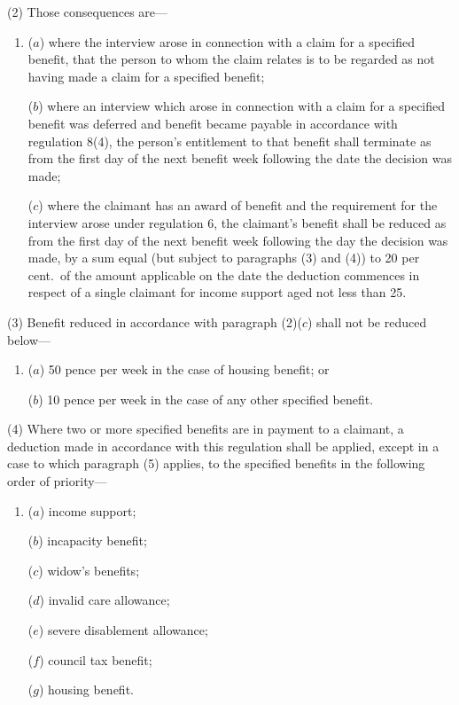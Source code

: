 \documentclass[12pt,a4paper]{article}
\begin{document}
(2) Those consequences are—
\begin{enumerate}\item[]
($a$) where the interview arose in connection with a claim for a specified benefit, that the person to whom the claim relates is to be regarded as not having made a claim for a specified benefit;

($b$) where an interview which arose in connection with a claim for a specified benefit was deferred and benefit became payable in accordance with regulation 8(4), the person’s entitlement to that benefit shall terminate as from the first day of the next benefit week following the date the decision was made;

($c$) where the claimant has an award of benefit and the requirement for the interview arose under regulation 6, the claimant’s benefit shall be reduced as from the first day of the next benefit week following the day the decision was made, by a sum equal (but subject to paragraphs (3) and (4)) to 20 per cent.\ of the amount applicable on the date the deduction commences in respect of a single claimant for income support aged not less than 25.
\end{enumerate}

(3) Benefit reduced in accordance with paragraph (2)($c$)  shall not be reduced below—
\begin{enumerate}\item[]
($a$) 50 pence per week in the case of housing benefit; or

($b$) 10 pence per week in the case of any other specified benefit.
\end{enumerate}

(4) Where two or more specified benefits are in payment to a claimant, a deduction made in accordance with this regulation shall be applied, except in a case to which paragraph (5) applies, to the specified benefits in the following order of priority—
\begin{enumerate}\item[]
($a$) income support;

($b$) incapacity benefit;

($c$) widow’s benefits;

($d$) invalid care allowance;

($e$) severe disablement allowance;

($f$) council tax benefit;

($g$) housing benefit.
\end{enumerate}
\end{document}
